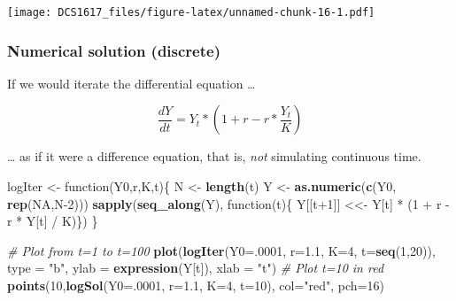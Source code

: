 \documentclass[]{book}
\newenvironment{Shaded}{\begin{snugshade}}{\end{snugshade}}
\newcommand{\KeywordTok}[1]{\textcolor[rgb]{0.13,0.29,0.53}{\textbf{{#1}}}}
\newcommand{\DataTypeTok}[1]{\textcolor[rgb]{0.13,0.29,0.53}{{#1}}}
\newcommand{\DecValTok}[1]{\textcolor[rgb]{0.00,0.00,0.81}{{#1}}}
\newcommand{\FloatTok}[1]{\textcolor[rgb]{0.00,0.00,0.81}{{#1}}}
\newcommand{\StringTok}[1]{\textcolor[rgb]{0.31,0.60,0.02}{{#1}}}
\newcommand{\CommentTok}[1]{\textcolor[rgb]{0.56,0.35,0.01}{\textit{{#1}}}}
\newcommand{\OtherTok}[1]{\textcolor[rgb]{0.56,0.35,0.01}{{#1}}}
\newcommand{\NormalTok}[1]{{#1}}
\begin{document}
\texttt{[image: DCS1617\_files/figure-latex/unnamed-chunk-16-1.pdf]}

\subsubsection*{Numerical solution
(discrete)}\label{numerical-solution-discrete}

If we would iterate the differential equation \ldots{}

\[
\frac{dY}{dt} = Y_t * (1 + r - r * \frac{Y_t}{K})
\]

\ldots{} as if it were a difference equation, that is, \emph{not}
simulating continuous time.

\begin{Shaded}
\begin{Highlighting}[]
\NormalTok{logIter <-}\StringTok{  }\NormalTok{function(Y0,r,K,t)\{}
  \NormalTok{N <-}\StringTok{ }\KeywordTok{length}\NormalTok{(t)}
  \NormalTok{Y <-}\StringTok{ }\KeywordTok{as.numeric}\NormalTok{(}\KeywordTok{c}\NormalTok{(Y0, }\KeywordTok{rep}\NormalTok{(}\OtherTok{NA}\NormalTok{,N}\DecValTok{-2}\NormalTok{)))}
  \KeywordTok{sapply}\NormalTok{(}\KeywordTok{seq_along}\NormalTok{(Y), function(t)\{ Y[[t}\DecValTok{+1}\NormalTok{]] <<-}\StringTok{ }\NormalTok{Y[t] *}\StringTok{ }\NormalTok{(}\DecValTok{1} \NormalTok{+}\StringTok{ }\NormalTok{r -}\StringTok{ }\NormalTok{r *}\StringTok{ }\NormalTok{Y[t] /}\StringTok{ }\NormalTok{K)\})}
  \NormalTok{\}}

\CommentTok{# Plot from t=1 to t=100}
\KeywordTok{plot}\NormalTok{(}\KeywordTok{logIter}\NormalTok{(}\DataTypeTok{Y0=}\NormalTok{.}\DecValTok{0001}\NormalTok{, }\DataTypeTok{r=}\FloatTok{1.1}\NormalTok{, }\DataTypeTok{K=}\DecValTok{4}\NormalTok{, }\DataTypeTok{t=}\KeywordTok{seq}\NormalTok{(}\DecValTok{1}\NormalTok{,}\DecValTok{20}\NormalTok{)), }\DataTypeTok{type =} \StringTok{"b"}\NormalTok{, }
     \DataTypeTok{ylab =} \KeywordTok{expression}\NormalTok{(Y[t]), }\DataTypeTok{xlab =} \StringTok{"t"}\NormalTok{)}
\CommentTok{# Plot t=10 in red}
\KeywordTok{points}\NormalTok{(}\DecValTok{10}\NormalTok{,}\KeywordTok{logSol}\NormalTok{(}\DataTypeTok{Y0=}\NormalTok{.}\DecValTok{0001}\NormalTok{, }\DataTypeTok{r=}\FloatTok{1.1}\NormalTok{, }\DataTypeTok{K=}\DecValTok{4}\NormalTok{, }\DataTypeTok{t=}\DecValTok{10}\NormalTok{), }\DataTypeTok{col=}\StringTok{"red"}\NormalTok{, }\DataTypeTok{pch=}\DecValTok{16}\NormalTok{)}
\end{Highlighting}
\end{Shaded}
\end{document}
